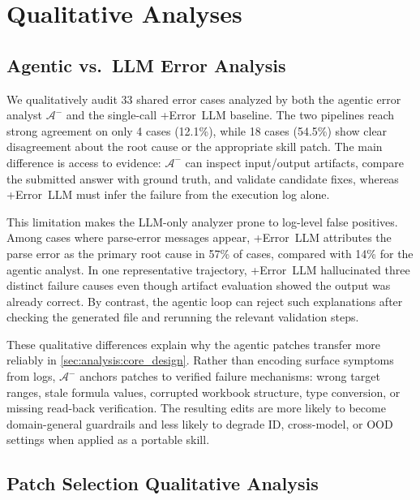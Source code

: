 \section{Qualitative Analyses}
\label{app:qualitative_analyses}

\subsection{Agentic vs.\ LLM Error Analysis}
\label{app:qual_agentic_vs_llm}

We qualitatively audit 33 shared error cases analyzed by both the agentic error analyst $\mathcal{A}^-$ and the single-call +Error~LLM baseline.
The two pipelines reach strong agreement on only 4 cases (12.1\%), while 18 cases (54.5\%) show clear disagreement about the root cause or the appropriate skill patch.
The main difference is access to evidence: $\mathcal{A}^-$ can inspect input/output artifacts, compare the submitted answer with ground truth, and validate candidate fixes, whereas +Error~LLM must infer the failure from the execution log alone.

This limitation makes the LLM-only analyzer prone to log-level false positives.
Among cases where parse-error messages appear, +Error~LLM attributes the parse error as the primary root cause in 57\% of cases, compared with 14\% for the agentic analyst.
In one representative trajectory, +Error~LLM hallucinated three distinct failure causes even though artifact evaluation showed the output was already correct.
By contrast, the agentic loop can reject such explanations after checking the generated file and rerunning the relevant validation steps.

These qualitative differences explain why the agentic patches transfer more reliably in \cref{sec:analysis:core_design}.
Rather than encoding surface symptoms from logs, $\mathcal{A}^-$ anchors patches to verified failure mechanisms: wrong target ranges, stale formula values, corrupted workbook structure, type conversion, or missing read-back verification.
The resulting edits are more likely to become domain-general guardrails and less likely to degrade ID, cross-model, or OOD settings when applied as a portable skill.

\subsection{Patch Selection Qualitative Analysis}
\label{app:qual_patch_selection}

